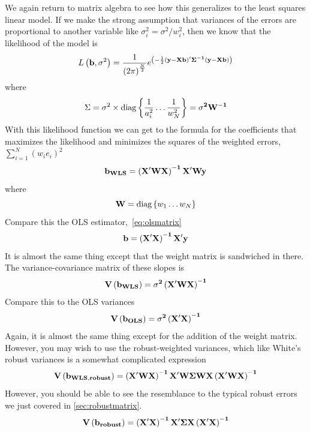 We again return to matrix algebra to see how this generalizes to the least squares linear model. If we make the strong assumption that variances of the errors are proportional to another variable like $\sigma_i^2=\sigma^2/w_i^2$, then we know that the likelihood of the model is
\begin{equation}
L\left({\bf b},\sigma^2\right)=\frac{1}{\left(2\pi\right)^{\frac{N}{2}}}e^{\left(-\frac{1}{2}\bf{\left(y-Xb\right)'\Sigma^{-1}\left(y-Xb\right)}\right)}
\end{equation}
where
\begin{equation}
\Sigma = \sigma^2\times \mbox{diag}\left\{\frac{1}{a_i^2}\ldots\frac{1}{w_N^2}\right\}={\bf \sigma^2W^{-1}}
\end{equation}
With this likelihood function we can get to the formula for the coefficients that maximizes the likelihood and minimizes the squares of the weighted errors, $\sum_{i=1}^N\left(w_ie_i\right)^2$
\begin{equation}
\bf b_{WLS}=\left(X'WX\right)^{-1}X'Wy
\end{equation}
where
\begin{equation}
{\bf W} = \mbox{diag}\left\{w_1\ldots w_N\right\}
\end{equation}
Compare this the OLS estimator,~\eqref{eq:olsmatrix}
\[
{\bf{b=\left(X'X\right)^{-1}X'y}}
\]
It is almost the same thing except that the weight matrix is sandwiched in there. The variance-covariance matrix of these slopes is
\begin{equation}
\bf V\left(b_{WLS}\right)=\sigma^2\left(X'WX\right)^{-1}
\end{equation}
Compare this to the OLS variances
\begin{equation}
\bf V\left(b_{OLS}\right)=\sigma^2\left(X'X\right)^{-1}
\end{equation}
Again, it is almost the same thing except for the addition of the weight matrix. However, you may wish to use the robust-weighted variances, which like White's robust variances is a somewhat complicated expression
\begin{equation}
\bf V\left(b_{WLS, robust}\right)=\left(X'WX\right)^{-1}X'W\Sigma WX\left(X'WX\right)^{-1}
\end{equation}
However, you should be able to see the resemblance to the typical robust errors we just covered in \ref{sec:robustmatrix}.
\begin{equation}
\bf V\left(b_{robust}\right)=\left(X'X\right)^{-1}X'\Sigma X\left(X'X\right)^{-1}
\end{equation}
